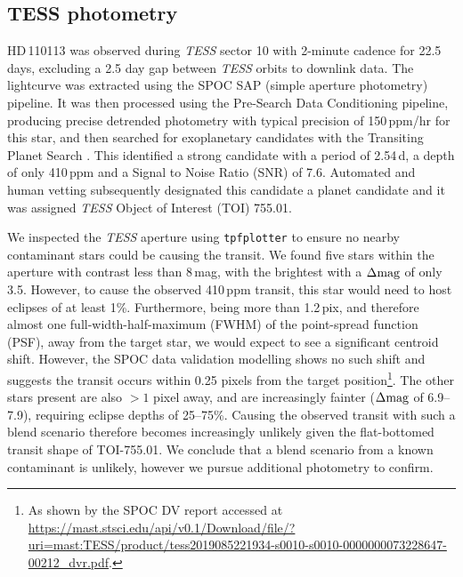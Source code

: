 \documentclass[fleqn,usenatbib]{mnras}
\newcommand{\tess}{{\it TESS}}
\newcommand{\Tdepth}{410\,ppm}
\newcommand{\Tstar}{HD\,110113}
\begin{document}
\subsection{TESS photometry}
\Tstar{} was observed during \tess{} sector 10 with 2-minute cadence for 22.5 days, excluding a 2.5 day gap between \tess{} orbits to downlink data.
The lightcurve was extracted using the SPOC \citep[Science Processing Operations Centre;][]{jenkins2016tess} SAP (simple aperture photometry) pipeline.
It was then processed using the Pre-Search Data Conditioning \citep[PDC,][]{stumpe2012kepler,2012PASP..124.1000S,stumpe2014multiscale} pipeline, producing precise detrended photometry with typical precision of 150\,ppm/hr for this star, and then searched for exoplanetary candidates with the Transiting Planet Search \citep[TPS;][]{2010SPIE.7740E..0DJ}.
This identified a strong candidate with a period of 2.54\,d, a depth of only \Tdepth{} and a Signal to Noise Ratio (SNR) of 7.6.
Automated and human vetting subsequently designated this candidate a planet candidate and it was assigned \tess{} Object of Interest (TOI) 755.01. 

We inspected the \tess{} aperture using \texttt{tpfplotter} \citep[plotted in Figure \ref{fig:tpf};][]{2020A&A...635A.128A} to ensure no nearby contaminant stars could be causing the transit.
We found five stars within the aperture with contrast less than 8\,mag, with the brightest with a $\Delta{\rm mag}$ of only 3.5.
However, to cause the observed \Tdepth{} transit, this star would need to host eclipses of at least 1\%. 
Furthermore, being more than 1.2\,pix, and therefore almost one full-width-half-maximum (FWHM) of the point-spread function (PSF), away from the target star, we would expect to see a significant centroid shift. 
However, the SPOC data validation modelling \citep{Twicken:DVdiagnostics2018,Li:DVmodelFit2019} shows no such shift and suggests the transit occurs within 0.25 pixels from the target position\footnote{As shown by the SPOC DV report accessed at \url{https://mast.stsci.edu/api/v0.1/Download/file/?uri=mast:TESS/product/tess2019085221934-s0010-s0010-0000000073228647-00212_dvr.pdf}.}.
The other stars present are also $>1$ pixel away, and are increasingly fainter ($\Delta{\rm mag}$ of 6.9--7.9), requiring eclipse depths of 25--75\%.
Causing the observed transit with such a blend scenario therefore becomes increasingly unlikely given the flat-bottomed transit shape of TOI-755.01.
We conclude that a blend scenario from a known contaminant is unlikely, however we pursue additional photometry to confirm.
\end{document}
